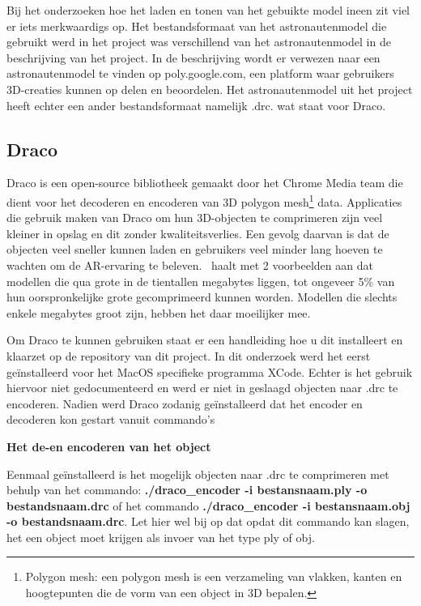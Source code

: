 
Bij het onderzoeken hoe het laden en tonen van het gebuikte model ineen zit viel er iets merkwaardigs op. Het bestandsformaat van het astronautenmodel die gebruikt werd in het project was verschillend van het astronautenmodel in de beschrijving van het project. In de beschrijving wordt er verwezen naar een astronautenmodel te vinden op poly.google.com, een platform waar gebruikers 3D-creaties kunnen op delen en beoordelen. Het astronautenmodel uit het project heeft echter een ander bestandsformaat namelijk .drc. wat staat voor Draco.

\subsection{Draco}

Draco is een open-source bibliotheek gemaakt door het Chrome Media team  die dient voor het decoderen en encoderen van 3D polygon mesh\footnote{Polygon mesh: een polygon mesh is een verzameling van vlakken, kanten en hoogtepunten die de vorm van een object in 3D bepalen. } data. Applicaties die gebruik maken van Draco om hun 3D-objecten te comprimeren zijn veel kleiner in opslag en dit zonder kwaliteitsverlies. Een gevolg daarvan is dat de objecten veel sneller kunnen laden en gebruikers veel minder lang hoeven te wachten om de AR-ervaring te beleven.~\textcite{Nedrich2019} haalt met 2 voorbeelden aan dat modellen die qua grote in de tientallen megabytes liggen, tot ongeveer 5\% van hun oorspronkelijke grote gecomprimeerd kunnen worden. Modellen die slechts enkele megabytes groot zijn, hebben het daar moeilijker mee. 

Om Draco te kunnen gebruiken staat er een handleiding hoe u dit installeert en klaarzet op de repository van dit project. In dit onderzoek werd het eerst geïnstalleerd voor het MacOS specifieke programma XCode. Echter is het gebruik hiervoor niet gedocumenteerd en werd er niet in geslaagd objecten naar .drc te encoderen. Nadien werd Draco zodanig geïnstalleerd dat het encoder en decoderen kon gestart vanuit commando's

\textbf{Het de-en encoderen van het object}

Eenmaal geïnstalleerd is het mogelijk objecten naar .drc te comprimeren met behulp van het commando: \textbf{./draco\_encoder -i bestansnaam.ply -o bestandsnaam.drc} of het commando \textbf{./draco\_encoder -i bestansnaam.obj -o bestandsnaam.drc}. Let hier wel bij op dat opdat dit commando kan slagen, het een object moet krijgen als invoer van het type ply of obj. 

